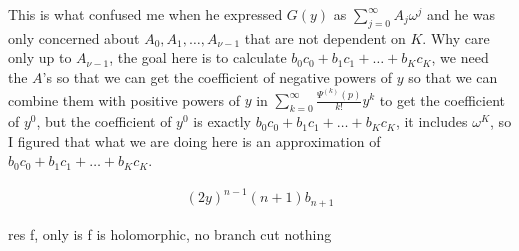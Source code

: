 \documentclass[aps,preprint,preprintnumbers,nofootinbib,showpacs,prd]{revtex4-1}
\newcommand{\nbea}{\begin{eqnarray*}}
\newcommand{\neea}{\end{eqnarray*}}
\begin{document}
This is what confused me when he expressed $G(y)$ as $\sum_{j=0}^\infty A_j \omega^j$ and he was only concerned about $A_0, A_1, \dots, A_{\nu-1}$ that are not dependent on $K$. Why care only up to $A_{\nu-1}$, the goal here is to calculate $b_0 c_0 + b_1 c_1 + \dots + b_Kc_K$, we need the $A$'s so that we can get the coefficient of negative powers of $y$ so that we can combine them with positive powers of $y$ in $\sum_{k=0}^\infty \frac{\Psi^{(k)}(p)}{k!} y^k$ to get the coefficient of $y^0$, but the coefficient of $y^0$ is exactly $b_0 c_0 + b_1 c_1 + \dots + b_Kc_K$, it includes $\omega^K$, so I figured that what we are doing here is an approximation of $b_0 c_0 + b_1 c_1 + \dots + b_Kc_K$.



%
\nbea
(2y)^{n-1}(n+1)b_{n+1}
\neea
%















res f, only is f is holomorphic, no branch cut nothing
\end{document}
